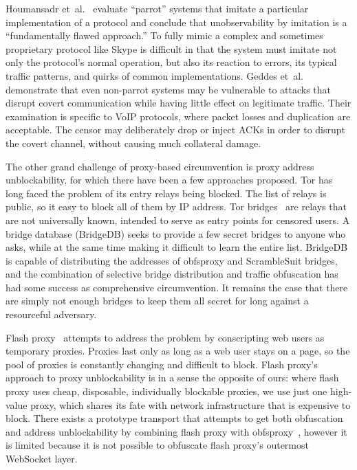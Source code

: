 \documentclass{article}
\begin{document}
Houmansadr et~al.~\cite{parrot} evaluate ``parrot'' systems that imitate a particular implementation of a protocol
and conclude that unobservability by imitation is a ``fundamentally
flawed approach.''
To fully mimic a complex and sometimes proprietary protocol like Skype
is difficult in that the system must imitate not only the protocol's normal operation, but also its reaction to errors,
its typical traffic patterns, and quirks of common implementations.
Geddes et~al.~\cite{acks}
demonstrate that even non-parrot systems may be vulnerable to
attacks that disrupt covert communication while having little effect
on legitimate traffic. Their examination is specific to VoIP protocols,
where packet losses and duplication are acceptable. The censor may
deliberately drop or inject ACKs in order to disrupt the covert channel, without causing
much collateral damage.


The other grand challenge of proxy-based circumvention is proxy address unblockability,
for which there have been a few approaches proposed.
Tor has long faced the problem of its entry relays being blocked. The list of
relays is public, so it easy to block all of them by IP address. Tor
bridges~\cite{tor-blocking} are relays that are not universally known, intended
to serve as entry points for censored users. A bridge database (BridgeDB) seeks to
provide a few secret bridges to anyone who asks, while at the same time making it
difficult to learn the entire list. BridgeDB is capable of distributing
the addresses of obfsproxy and ScrambleSuit bridges, and the combination
of selective bridge distribution and traffic obfuscation has had some success as comprehensive circumvention.
It remains the case that there are simply not enough bridges to keep them all secret for long against a resourceful adversary.

Flash proxy~\cite{flashproxy} attempts to address the problem  by
conscripting web users as temporary proxies. Proxies last only as long as a web
user stays on a page, so the pool of proxies is constantly changing and
difficult to block.
Flash proxy's approach to proxy unblockability is in a sense
the opposite of ours: where flash proxy uses cheap, disposable, individually blockable proxies,
we use just one high-value proxy, which shares its fate with network
infrastructure that is expensive to block.
There exists a prototype transport that attempts to get both
obfuscation and address unblockability by combining flash proxy
with obfsproxy~\cite{obfs-flash}, however it is limited because it is not
possible to obfuscate flash proxy's outermost WebSocket layer.
\end{document}
